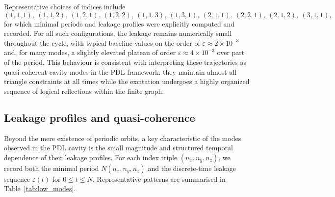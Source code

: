 \documentclass{article}
\theoremstyle{definition}
\begin{document}
Representative choices of indices include
\[
(1,1,1),\ (1,1,2),\ (1,2,1),\ (1,2,2),\ (1,1,3),\ (1,3,1),\ (2,1,1),\ (2,2,1),\ (2,1,2),\ (3,1,1),
\]
for which minimal periods and leakage profiles were explicitly computed and recorded.\cite{Effective_Fields_PDL_2026} For all such configurations, the leakage remains numerically small throughout the cycle, with typical baseline values on the order of $\varepsilon \approx 2\times 10^{-3}$ and, for many modes, a slightly elevated plateau of order $\varepsilon \approx 4\times 10^{-3}$ over part of the period.\cite{Exponent_18_PDL_2026} This behaviour is consistent with interpreting these trajectories as quasi-coherent cavity modes in the PDL framework: they maintain almost all triangle constraints at all times while the excitation undergoes a highly organized sequence of logical reflections within the finite graph.

\subsection{Leakage profiles and quasi-coherence}

Beyond the mere existence of periodic orbits, a key characteristic of the modes observed in the PDL cavity is the small magnitude and structured temporal dependence of their leakage profiles.\cite{Exponent_18_PDL_2026,Topological_Reformulation_PDL_2026} For each index triple $(n_x,n_y,n_z)$, we record both the minimal period $N(n_x,n_y,n_z)$ and the discrete-time leakage sequence $\varepsilon(t)$ for $0 \le t \le N$. Representative patterns are summarised in Table~\ref{tab:low_modes}.
\end{document}

